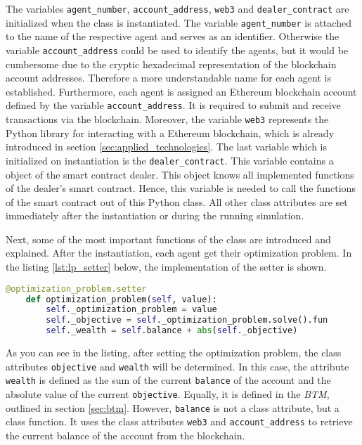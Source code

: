 The variables \verb|agent_number|, \verb|account_address|, \verb|web3| and \verb|dealer_contract| are initialized when the class is instantiated.
The variable \verb|agent_number| is attached to the name of the respective agent and serves as an identifier. 
Otherwise the variable \verb|account_address| could be used to identify the agents, 
but it would be cumbersome due to the cryptic hexadecimal representation of the blockchain account addresses.
Therefore a more understandable name for each agent is established.
Furthermore, each agent is assigned an Ethereum blockchain account defined by the variable \verb|account_address|. It is required to submit and 
receive transactions via the blockchain.
Moreover, the variable \verb|web3| represents the Python library for interacting with a Ethereum blockchain, which is already introduced in section \ref{sec:applied_technologies}.
The last variable which is initialized on instantiation is the \verb|dealer_contract|. 
This variable contains a object of the smart contract dealer. This object knows all implemented functions of the dealer's smart contract.
Hence, this variable is needed to call the functions of the smart contract out of this Python class.
All other class attributes are set immediately after the instantiation or during the running simulation. 

Next, some of the most important functions of the class are introduced and explained.
After the instantiation, each agent get their optimization problem. In the listing \ref{lst:lp_setter} below, the implementation 
of the setter is shown.

\begin{lstlisting}[label=lst:lp_setter, caption=Setter of optimization problem, language=Python]
    @optimization_problem.setter
    def optimization_problem(self, value):
        self._optimization_problem = value
        self._objective = self._optimization_problem.solve().fun
        self._wealth = self.balance + abs(self._objective)
\end{lstlisting}

As you can see in the listing, after setting the optimization problem, the class attributes \verb|objective| and \verb|wealth| will be determined.
In this case, the attribute \verb|wealth| is defined as the sum of the current \verb|balance| of the account and the absolute value of the current \verb|objective|.
Equally, it is defined in the \textit{BTM}, outlined in section \ref{sec:btm}.
However, \verb|balance| is not a class attribute, but a class function. It uses the class attributes \verb|web3| and \verb|account_address| to retrieve the current
balance of the account from the blockchain.

